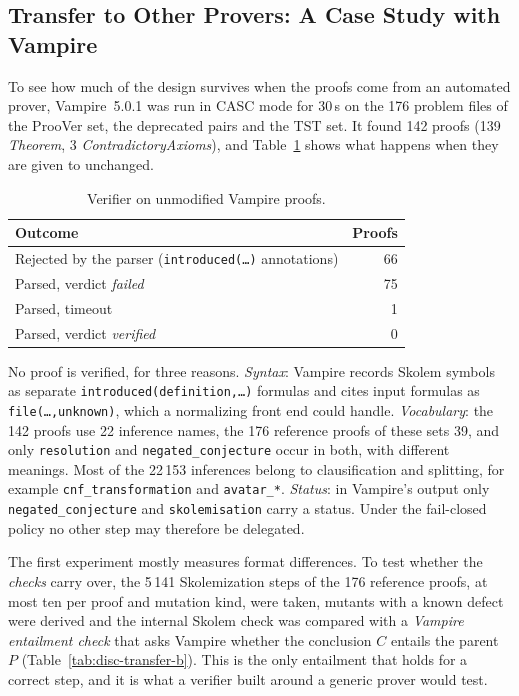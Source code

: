 \subsection{Transfer to Other Provers: A Case Study with Vampire}
\label{subsec:disc-transfer}

To see how much of the design survives when the proofs come from an automated prover, Vampire~5.0.1 was run in CASC mode for 30\,s on the 176 problem files of the ProoVer set, the deprecated pairs and the TST set.
It found 142 proofs (139 \emph{Theorem}, 3 \emph{ContradictoryAxioms}), and Table~\ref{tab:disc-transfer-a} shows what happens when they are given to \TSTPy{} unchanged.

\begin{table}[!htb]
\centering
\small
\caption{Verifier on unmodified Vampire proofs.}
\label{tab:disc-transfer-a}
\begin{tabular}{@{}l r@{}}
\toprule
Outcome & Proofs \\
\midrule
Rejected by the parser (\texttt{introduced(\dots)} annotations) & 66 \\
Parsed, verdict \emph{failed} & 75 \\
Parsed, timeout & 1 \\
Parsed, verdict \emph{verified} & 0 \\
\bottomrule
\end{tabular}
\end{table}

No proof is verified, for three reasons.
\emph{Syntax}: Vampire records Skolem symbols as separate \texttt{introduced(definition,\dots)} formulas and cites input formulas as \texttt{file(\dots,unknown)}, which a normalizing front end could handle.
\emph{Vocabulary}: the 142 proofs use 22 inference names, the 176 reference proofs of these sets 39, and only \texttt{resolution} and \texttt{negated\_conjecture} occur in both, with different meanings. Most of the 22\,153 inferences belong to clausification and splitting, for example \texttt{cnf\_transformation} and \texttt{avatar\_*}.
\emph{Status}: in Vampire's output only \texttt{negated\_conjecture} and \texttt{skolemisation} carry a status. Under the fail-closed policy no other step may therefore be delegated.

The first experiment mostly measures format differences.
To test whether the \emph{checks} carry over, the 5\,141 Skolemization steps of the 176 reference proofs, at most ten per proof and mutation kind, were taken, mutants with a known defect were derived and the internal Skolem check was compared with a \emph{Vampire entailment check} that asks Vampire whether the conclusion $C$ entails the parent $P$ (Table~\ref{tab:disc-transfer-b}).
This is the only entailment that holds for a correct step, and it is what a verifier built around a generic prover would test.

